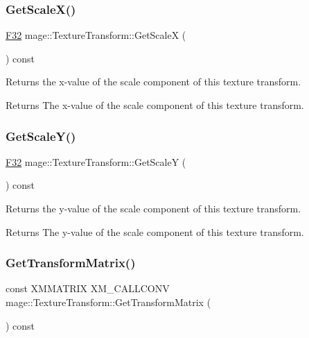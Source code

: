 \subsubsection{\texorpdfstring{Get\+Scale\+X()}{GetScaleX()}}
{\footnotesize\ttfamily \mbox{\hyperlink{namespacemage_aa97e833b45f06d60a0a9c4fc22ae02c0}{F32}} mage\+::\+Texture\+Transform\+::\+Get\+ScaleX (\begin{DoxyParamCaption}{ }\end{DoxyParamCaption}) const\hspace{0.3cm}{\ttfamily [noexcept]}}

Returns the x-\/value of the scale component of this texture transform.

\begin{DoxyReturn}{Returns}
The x-\/value of the scale component of this texture transform. 
\end{DoxyReturn}
\mbox{\label{classmage_1_1_texture_transform_a06a3314cef041f0070f7203e1538a2eb}} 
\subsubsection{\texorpdfstring{Get\+Scale\+Y()}{GetScaleY()}}
{\footnotesize\ttfamily \mbox{\hyperlink{namespacemage_aa97e833b45f06d60a0a9c4fc22ae02c0}{F32}} mage\+::\+Texture\+Transform\+::\+Get\+ScaleY (\begin{DoxyParamCaption}{ }\end{DoxyParamCaption}) const\hspace{0.3cm}{\ttfamily [noexcept]}}

Returns the y-\/value of the scale component of this texture transform.

\begin{DoxyReturn}{Returns}
The y-\/value of the scale component of this texture transform. 
\end{DoxyReturn}
\mbox{\label{classmage_1_1_texture_transform_a8463a5d1060614cd3a8847b527094fc0}} 
\subsubsection{\texorpdfstring{Get\+Transform\+Matrix()}{GetTransformMatrix()}}
{\footnotesize\ttfamily const X\+M\+M\+A\+T\+R\+IX X\+M\+\_\+\+C\+A\+L\+L\+C\+O\+NV mage\+::\+Texture\+Transform\+::\+Get\+Transform\+Matrix (\begin{DoxyParamCaption}{ }\end{DoxyParamCaption}) const\hspace{0.3cm}{\ttfamily [noexcept]}}

